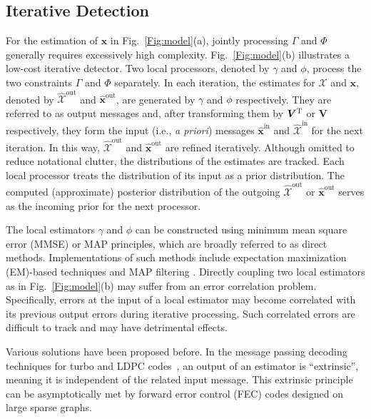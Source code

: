 \documentclass[journal]{IEEEtran}
\newcommand{\mr}{\mathrm}
\renewcommand{\bf}{\bm}
\begin{document}
\subsection{Iterative Detection}
For the estimation of $\bf{x}$ in Fig.~\ref{Fig:model}(a), jointly processing $\Gamma$ and $\Phi$ generally requires excessively high complexity. Fig.~\ref{Fig:model}(b) illustrates a low-cost iterative detector. Two local processors, denoted by $\gamma$ and $\phi$, process the two constraints $\Gamma$ and $\Phi$ separately. In each iteration, the estimates for $\bf{\mathcal{X}}$ and $\bf{x}$, denoted by $\bf{\mathcal{\hat{X}}}^{\mr{out}}$ and $\hat{\bf{x}}^{\mr{out}}$, are generated by $\gamma$ and $\phi$ respectively. They are referred to as output messages and, after transforming them by $\bf{V}^{\rm T}$ or $\bf{V}$ respectively, they form the input (i.e., \textit{a priori}) messages $\hat{\bf{x}}^{\mr{in}}$ and $\bf{\mathcal{\hat{X}}}^{\mr{in}}$ for the next iteration. In this way, $\bf{\mathcal{\hat{X}}}^{\mr{out}}$ and $\hat{\bf{x}}^{\mr{out}}$ are refined iteratively. Although omitted to reduce notational clutter, the distributions of the estimates are tracked. Each local processor treats the distribution of its input as a prior distribution. The computed (approximate) posterior distribution of the outgoing $\bf{\mathcal{\hat{X}}}^{\mr{out}}$ or $\hat{\bf{x}}^{\mr{out}}$ serves as the incoming prior for the next processor.

The local estimators $\gamma$ and $\phi$ can be constructed using minimum mean square error (MMSE) or MAP principles, which are broadly referred to as direct methods.  Implementations of such methods include expectation maximization (EM)-based techniques and MAP filtering \cite{Moon1996EM, Lodge1993, Loeliger2009EM}. Directly coupling two local estimators as in Fig.~\ref{Fig:model}(b) may suffer from an error correlation problem. Specifically,  errors at the input of a local estimator may become correlated with its previous output errors during iterative processing. Such correlated errors are difficult to track and may have detrimental effects.  

Various solutions have been proposed before. In the message passing decoding techniques for turbo and LDPC codes~\cite{Richardson2001,TurboCode}, an output of an estimator is ``extrinsic'', meaning it is independent of the related input message. This extrinsic principle can be asymptotically met by forward error control (FEC) codes designed on large sparse graphs. %
\end{document}
